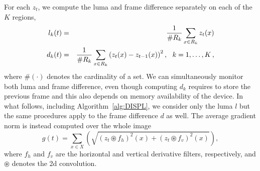 \documentclass{llncs}
\begin{document}
For each $z_t$, we compute the luma and frame difference separately on each of the $K$ regions,
\begin{eqnarray}
\vspace{-0.5cm}
l_k(t) &=& \frac{1}{\#R_k} \sum_{x \in R_k} z_t(x) \label{eq:lumaRegions}\\
d_k(t) &=&\frac{1}{\#R_k} \sum_{x \in R_k} \left(z_t(x) - z_{t-1}(x) \right)^2, \ \ k = 1, \dots, K\,,\label{eq:FDRegions}
\vspace{-0.5cm}
\end{eqnarray}
where $\#(\cdot)$ denotes the cardinality of a set. We can simultaneously monitor both luma and frame difference, even though computing $d_k$ requires to store the previous frame and this also depends on memory availability of the device. In what follows, including Algorithm~\ref{alg:DISPL}, we consider only the luma $l$ but the same procedures apply to the frame difference $d$ as well. The average gradient norm is instead computed over the whole image
\begin{equation}
\label{eq:normaGradiente}
g(t) = \sum_{x \in X} \left (\sqrt{\left(z_t \circledast f_h\right)^2(x) + \left(z_t \circledast f_v\right)^2(x)}\right),
\end{equation}
where $f_h$ and $f_v$ are the horizontal and vertical derivative filters, respectively, and $\circledast$ denotes the 2d convolution. 
\end{document}
